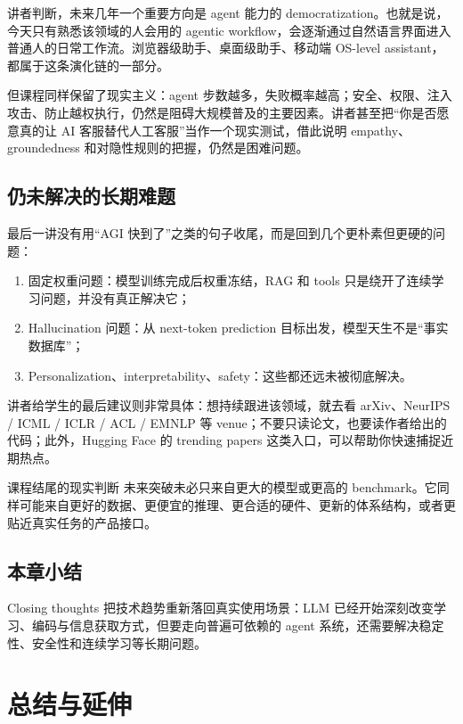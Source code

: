 \documentclass[a4paper]{article}
\begin{document}
讲者判断，未来几年一个重要方向是 agent 能力的 democratization。也就是说，今天只有熟悉该领域的人会用的 agentic workflow，会逐渐通过自然语言界面进入普通人的日常工作流。浏览器级助手、桌面级助手、移动端 OS-level assistant，都属于这条演化链的一部分。

但课程同样保留了现实主义：agent 步数越多，失败概率越高；安全、权限、注入攻击、防止越权执行，仍然是阻碍大规模普及的主要因素。讲者甚至把“你是否愿意真的让 AI 客服替代人工客服”当作一个现实测试，借此说明 empathy、groundedness 和对隐性规则的把握，仍然是困难问题。

\subsection{仍未解决的长期难题}

最后一讲没有用“AGI 快到了”之类的句子收尾，而是回到几个更朴素但更硬的问题：

\begin{enumerate}
\item 固定权重问题：模型训练完成后权重冻结，RAG 和 tools 只是绕开了连续学习问题，并没有真正解决它；
\item Hallucination 问题：从 next-token prediction 目标出发，模型天生不是“事实数据库”；
\item Personalization、interpretability、safety：这些都还远未被彻底解决。
\end{enumerate}

讲者给学生的最后建议则非常具体：想持续跟进该领域，就去看 arXiv、NeurIPS / ICML / ICLR / ACL / EMNLP 等 venue；不要只读论文，也要读作者给出的代码；此外，Hugging Face 的 trending papers 这类入口，可以帮助你快速捕捉近期热点。

\begin{warningbox}{课程结尾的现实判断}
未来突破未必只来自更大的模型或更高的 benchmark。它同样可能来自更好的数据、更便宜的推理、更合适的硬件、更新的体系结构，或者更贴近真实任务的产品接口。
\end{warningbox}

\subsection{本章小结}

Closing thoughts 把技术趋势重新落回真实使用场景：LLM 已经开始深刻改变学习、编码与信息获取方式，但要走向普遍可依赖的 agent 系统，还需要解决稳定性、安全性和连续学习等长期问题。

\section{总结与延伸}
\end{document}
